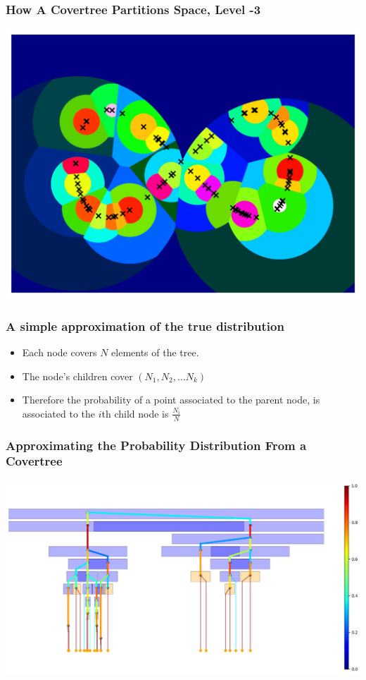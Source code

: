 \documentclass{beamer}
\begin{document}
\begin{frame}
\frametitle{How A Covertree Partitions Space, Level -3}
\begin{center}
    \includegraphics[scale=0.6]{partition_4.png}
\end{center}
\end{frame}

\begin{frame}
    \frametitle{A simple approximation of the true distribution}
    \begin{itemize}
        \item Each node covers $N$ elements of the tree.
        \item The node's children cover $(N_1, N_2, \dots N_k)$
        \item Therefore the probability of a point associated to the parent node, is associated to the $i$th child node is $\frac{N_i}{N}$
    \end{itemize}
\end{frame}

\begin{frame}
\frametitle{Approximating the Probability Distribution From a Covertree}
\begin{center}
    \includegraphics[scale=0.35]{1d_vis_post_prob_0.png}
\end{center}
\end{frame}
\end{document}
